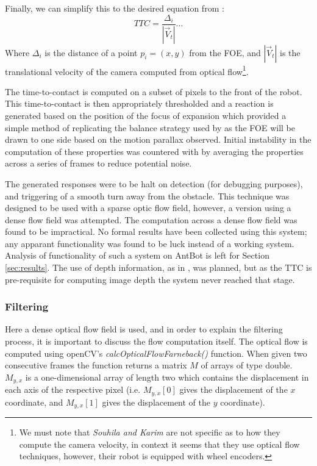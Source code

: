 \documentclass[a4paper,12pt,twoside,openright]{article}
\begin{document}
Finally, we can simplify this to the desired equation from \cite{Souhila2007}:
\begin{equation}
TTC = \frac{\Delta_i}{|\vec{V}_t|} \dots
\end{equation}
Where $\Delta_i$ is the distance of a point $p_i = (x,y)$ from the FOE, and $|\vec{V}_t|$ is the
translational velocity of the camera computed from optical flow\footnote{We must note that
\textit{Souhila and Karim} are not specific as to how they compute the camera velocity, in context
it seems that they use optical flow techniques, however, their robot is equipped with wheel encoders.}\cite{Souhila2007}.
\newline

The time-to-contact is computed on a subset of pixels to the front of the robot.
This time-to-contact is then appropriately thresholded and a reaction is generated based on the
position of the focus of expansion which provided a simple method of replicating the balance strategy
used by \cite{Souhila2007} as the FOE will be drawn to one side based on the motion parallax observed.
Initial instability in the computation of these properties was countered with by averaging the properties
across a series of frames to reduce potential noise.
\newline

The generated responses were to be halt on detection (for debugging purposes), and triggering of a
smooth turn away from the obstacle. This technique was designed to be used with a sparse optic flow
field, however, a version using a dense flow field was attempted. The computation across a dense
flow field was found to be impractical. No formal results have been collected using this system; any
apparant functionality was found to be luck instead of a working system. Analysis of functionality
of such a system on AntBot is left for Section \ref{sec:results}. The use of depth information, as in
\cite{Low2005, Souhila2007}, was planned, but as the TTC is pre-requisite for computing image depth the
system never reached that stage.


\subsubsection{Filtering}
Here a dense optical flow field is used, and in order to explain the filtering process, it is important
to discuss the flow computation itself. The optical flow is computed using openCV's
\textit{calcOpticalFlowFarneback()} function. When given two consecutive frames the function returns
a matrix $M$ of arrays of type double. $M_{y,x}$ is a one-dimensional array of length two which contains
the displacement in each axis of the respective pixel (i.e. $M_{y,x}[0]$ gives the displacement of the $x$
coordinate, and $M_{y,x}[1]$ gives the displacement of the $y$ coordinate).
\newline
\end{document}

